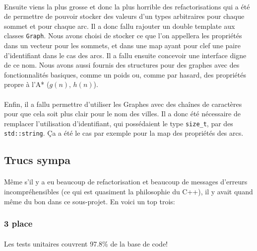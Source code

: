 \documentclass[french]{article}
\begin{document}
\paragraph{} Ensuite viens la plus grosse et donc la plus horrible des
refactorisations qui a été de permettre de pouvoir stocker des valeurs d'un
types arbitraires pour chaque sommet et pour chaque arc. Il a donc fallu
rajouter un double template aux classes \texttt{Graph}. Nous avons choisi de
stocker ce que l'on appellera les propriétés dans un vecteur pour les sommets,
et dans une map ayant pour clef une paire d'identifiant dans le cas des arcs.
Il a fallu ensuite concevoir une interface digne de ce nom. Nous avons aussi
fournis des structures pour des graphes avec des fonctionnalités basiques,
comme un poids ou, comme par hasard, des propriétés propre à l'A* ($g(n)$,
$h(n)$).

\paragraph{} Enfin, il a fallu permettre d'utiliser les Graphes avec des
chaînes de caractères pour que cela soit plus clair pour le nom des villes. Il
a donc été nécessaire de remplacer l'utilisation d'identifiant, qui possédaient
le type \texttt{size_t}, par des \texttt{std::string}. Ça a
été le cas par exemple pour la map des propriétés des arcs.

\subsection{Trucs sympa}

\paragraph{} Même s'il y a eu beaucoup de refactorisation et beaucoup de
messages d'erreurs incompréhensibles (ce qui est quasiment la philosophie du
C++), il y avait quand même du bon dans ce sous-projet. En voici un top trois:

\subsubsection{3\ieme{} place}

\paragraph{} Les tests unitaires couvrent 97.8\% de la base de code! \Smiley{}
\end{document}
